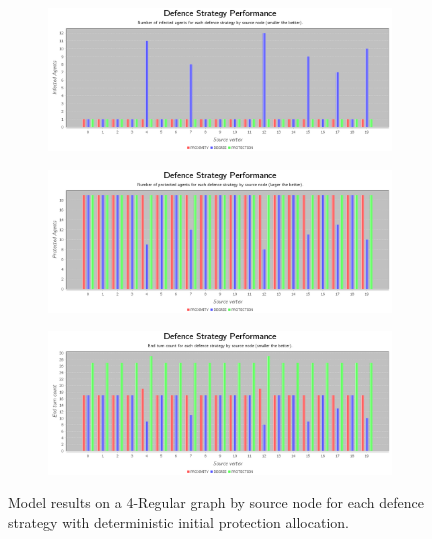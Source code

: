 \documentclass[results.tex]{subfiles}
\begin{document}
\begin{figure}[!ht]
\centering
     \begin{subfigure}[b]{0.9\textwidth}
         \centering
         \includegraphics[width=\textwidth]{4Regular/Deterministic/DeterministicInfectedChart}
         \label{fig:4reg-det-infected}
     \end{subfigure}
     \vfill
     \begin{subfigure}[b]{0.9\textwidth}
         \centering
         \includegraphics[width=\textwidth]{4Regular/Deterministic/DeterministicProtectedChart}
         \label{fig:4reg-det-protected}
     \end{subfigure}
     \vfill
     \begin{subfigure}[b]{0.9\textwidth}
         \centering
         \includegraphics[width=\textwidth]{4Regular/Deterministic/DeterministicEndTurnChart}
         \label{fig:4reg-det-end}
     \end{subfigure}
        \caption{Model results on a 4-Regular graph by source node for each defence strategy with deterministic initial protection allocation.}
        \label{fig:4reg-det-charts}
\end{figure}
\end{document}
